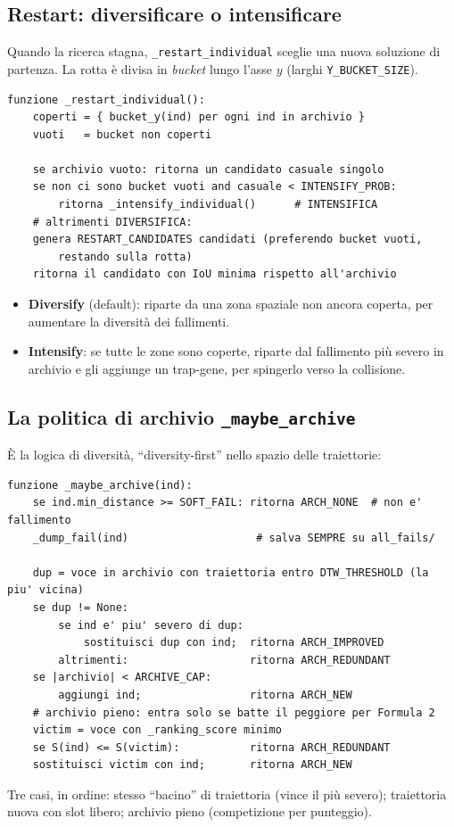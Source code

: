 \documentclass[11pt,a4paper]{report}
\newcommand{\code}[1]{\texttt{#1}}
\begin{document}
\subsection{Restart: diversificare o intensificare}
Quando la ricerca stagna, \code{\_restart\_individual} sceglie una nuova
soluzione di partenza. La rotta è divisa in \emph{bucket} lungo l'asse
$y$ (larghi \code{Y\_BUCKET\_SIZE}).
\begin{lstlisting}[style=pseudo]
funzione _restart_individual():
    coperti = { bucket_y(ind) per ogni ind in archivio }
    vuoti   = bucket non coperti

    se archivio vuoto: ritorna un candidato casuale singolo
    se non ci sono bucket vuoti and casuale < INTENSIFY_PROB:
        ritorna _intensify_individual()      # INTENSIFICA
    # altrimenti DIVERSIFICA:
    genera RESTART_CANDIDATES candidati (preferendo bucket vuoti,
        restando sulla rotta)
    ritorna il candidato con IoU minima rispetto all'archivio
\end{lstlisting}
\begin{itemize}
  \item \textbf{Diversify} (default): riparte da una zona spaziale non
        ancora coperta, per aumentare la diversità dei fallimenti.
  \item \textbf{Intensify}: se tutte le zone sono coperte, riparte dal
        fallimento più severo in archivio e gli aggiunge un trap-gene,
        per spingerlo verso la collisione.
\end{itemize}

\subsection{La politica di archivio \texttt{\_maybe\_archive}}
È la logica di diversità, ``diversity-first'' nello spazio delle
traiettorie:
\begin{lstlisting}[style=pseudo]
funzione _maybe_archive(ind):
    se ind.min_distance >= SOFT_FAIL: ritorna ARCH_NONE  # non e' fallimento
    _dump_fail(ind)                    # salva SEMPRE su all_fails/

    dup = voce in archivio con traiettoria entro DTW_THRESHOLD (la piu' vicina)
    se dup != None:
        se ind e' piu' severo di dup:
            sostituisci dup con ind;  ritorna ARCH_IMPROVED
        altrimenti:                   ritorna ARCH_REDUNDANT
    se |archivio| < ARCHIVE_CAP:
        aggiungi ind;                 ritorna ARCH_NEW
    # archivio pieno: entra solo se batte il peggiore per Formula 2
    victim = voce con _ranking_score minimo
    se S(ind) <= S(victim):           ritorna ARCH_REDUNDANT
    sostituisci victim con ind;       ritorna ARCH_NEW
\end{lstlisting}
Tre casi, in ordine: stesso ``bacino'' di traiettoria (vince il più
severo); traiettoria nuova con slot libero; archivio pieno (competizione
per punteggio).
\end{document}
